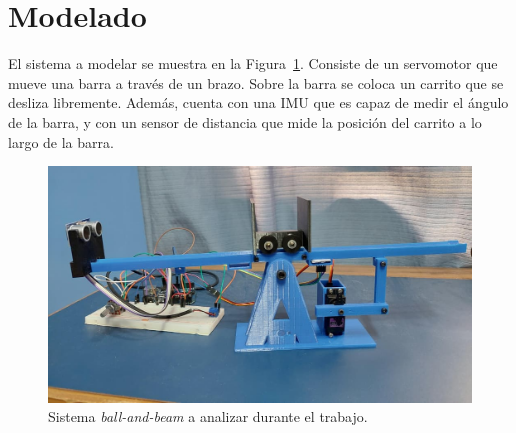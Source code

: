 \section{Modelado}

El sistema a modelar se muestra en la Figura~\ref{fig:planta}. Consiste de un servomotor que mueve una barra a través de un brazo. Sobre la barra se coloca un carrito que se desliza libremente. Además, cuenta con una IMU que es capaz de medir el ángulo de la barra, y con un sensor de distancia que mide la posición del carrito a lo largo de la barra.

\begin{figure}[!htbp]
    \centering
    \includegraphics[width=\linewidth]{img/planta.jpg}
    \caption{Sistema \emph{ball-and-beam} a analizar durante el trabajo.}
    \label{fig:planta}
\end{figure}

